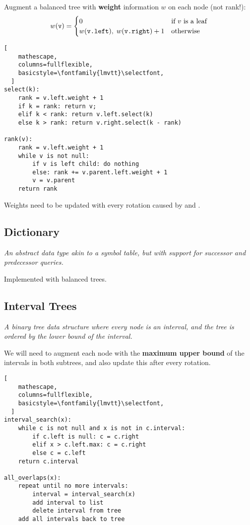 Augment a balanced tree with \textbf{weight} information $w$ on each node (not rank!):\\[-0.2em]
\[ w(\texttt{v}) = \begin{cases} 
    0 & \text{if $v$ is a leaf} \\
    w(\texttt{v.left}), \; w(\texttt{v.right}) + 1 & \text{otherwise} \\
 \end{cases}
\]

\begin{lstlisting}[
    mathescape,
    columns=fullflexible,
    basicstyle=\fontfamily{lmvtt}\selectfont,
  ]
select(k):
    rank = v.left.weight + 1
    if k = rank: return v;
    elif k < rank: return v.left.select(k)
    else k > rank: return v.right.select(k - rank)

rank(v):
    rank = v.left.weight + 1
    while v is not null:
        if v is left child: do nothing
        else: rank += v.parent.left.weight + 1
        v = v.parent
    return rank
\end{lstlisting}

Weights need to be updated with every rotation caused by  and .

\subsection{Dictionary}
\emph{An abstract data type akin to a symbol table, but with support for successor and predecessor queries.}

Implemented with balanced trees.

\subsection{Interval Trees}
\emph{A binary tree data structure where every node is an interval, and the tree is ordered by the lower bound of the interval.}

We will need to augment each node with the \textbf{maximum upper bound} of the intervals in both subtrees,
and also update this after every rotation.

\begin{lstlisting}[
    mathescape,
    columns=fullflexible,
    basicstyle=\fontfamily{lmvtt}\selectfont,
  ]
interval_search(x):
    while c is not null and x is not in c.interval:
        if c.left is null: c = c.right
        elif x > c.left.max: c = c.right
        else c = c.left
    return c.interval

all_overlaps(x):
    repeat until no more intervals:
        interval = interval_search(x)
        add interval to list
        delete interval from tree
    add all intervals back to tree
\end{lstlisting}

